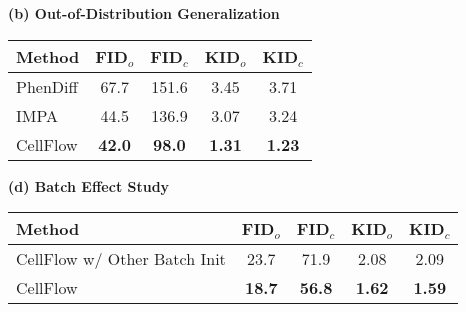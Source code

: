 \begin{table*}[!tb]
    \begin{minipage}[t]{0.45\textwidth}
        \centering
        \textbf{(b) Out-of-Distribution Generalization} \\
        \begin{tabular}{lcccc}
        \toprule
        Method & FID$_o$ & FID$_c$ & KID$_o$ & KID$_c$ \\
        \midrule
        PhenDiff & 67.7 & 151.6 & 3.45 & 3.71 \\
        IMPA & 44.5 & 136.9 & 3.07 & 3.24 \\
        CellFlow & \textbf{42.0} & \textbf{98.0} & \textbf{1.31} & \textbf{1.23} \\
        \bottomrule
        \end{tabular}
    \end{minipage}
    \hfill
    \begin{minipage}[t]{0.54\textwidth}
        \centering
        \textbf{(d) Batch Effect Study} \\
        \begin{tabular}{lcccc}
        \toprule
        Method & FID$_o$ & FID$_c$ & KID$_o$ & KID$_c$ \\
        \midrule
        CellFlow w/ Other Batch Init & 23.7 & 71.9 & 2.08 & 2.09 \\
        CellFlow & \textbf{18.7} & \textbf{56.8} & \textbf{1.62} & \textbf{1.59} \\
        \bottomrule
        \end{tabular}
    \end{minipage}
    
    \vspace{-0.5em}
    
    \caption{\textbf{More evaluation and ablation of \emph{CellFlow}.} 
    \textit{(a) MoA classification.} On the BBBC021 dataset, we train a classifier to predict the drug's mode of action (MoA) from cell morphology images and evaluate the accuracy of generated images. \emph{CellFlow} achieves significantly higher accuracy than other methods, closely aligning with ground-truth images and effectively reflecting the biological effects of perturbations.
    \textit{(b) Out-of-distribution generalization.} \emph{CellFlow} maintains strong performance when generating cell morphology images for novel chemical compounds not seen during training on BBBC021.
    \textit{(c) Ablation study.} Removing key components degrades \emph{CellFlow}'s performance, emphasizing their importance. 
    \textit{(d) Batch effect study.} \emph{CellFlow} shows improved performance when using control images from the same batch as initialization, highlighting the critical role of control images in calibrating batch effects.
    }
    \label{tab:ablation}
    \vspace{-1em}
\end{table*}